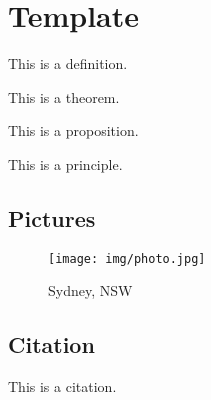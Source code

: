 

\section{Template}
\begin{definition}
    This is a definition.
\end{definition}

\begin{theorem}
    This is a theorem.
\end{theorem}

\begin{proposition}
    This is a proposition.
\end{proposition}

\begin{principle}
    This is a principle.
\end{principle}


\subsection{Pictures}

\begin{figure}[htbp]
    \center
    \texttt{[image: img/photo.jpg]}
    \caption{Sydney, NSW}
\end{figure}

\subsection{Citation}

This is a citation\cite{Eg}.

\newpage






